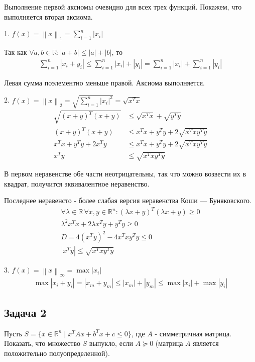 \documentclass{article}
\newcommand{\R}{\mathbb{R}}
\newcommand{\norm}[1]{\left\lVert#1\right\rVert}
\begin{document}
    Выполнение первой аксиомы очевидно для всех трех функций. Покажем, что выполняется вторая аксиома.
    \bigbreak
    
    1. $f(x) = \norm{x}_1 = \sum_{i = 1}^{n} |x_i|$
    
    Так как $\forall a, b \in \R : |a + b| \le |a| + |b|$, то
    \begin{align*}
         \sum_{i = 1}^{n} |x_i + y_i| \le 
         \sum_{i = 1}^{n} |x_i| + |y_i|  = 
         \sum_{i = 1}^{n} |x_i| + \sum_{i = 1}^{n} |y_i|
    \end{align*}
    
    Левая сумма поэлементно меньше правой. Аксиома выполняется.
    \bigbreak
    
    2. $f(x) = \norm{x}_2 = \sqrt{ \sum_{i = 1}^{n} |x_i|^2} = \sqrt{x^Tx}$
    \begin{align*}
         \sqrt{(x + y)^T(x + y)} &\le \sqrt{x^Tx} + \sqrt{y^Ty} \\
         (x + y)^T(x + y) &\le x^Tx + y^Ty + 2\sqrt{x^Txy^Ty} \\
         x^Tx + y^Ty + 2x^Ty &\le x^Tx + y^Ty + 2\sqrt{x^Txy^Ty} \\
         x^Ty &\le \sqrt{x^Txy^Ty} 
    \end{align*}
    
    В первом неравенстве обе части неотрицательны, так что можно возвести их в квадрат, получится эквивалентное неравенство.
    
    Последнее неравенсто - более слабая версия неравенства Коши — Буняковского.
    \begin{align*}
         \forall \lambda \in \R \, \forall x, y \in \R^n : (\lambda x + y)^T(\lambda x + y) \ge 0 \\
         \lambda^2 x^Tx + 2\lambda x^Ty + y^Ty \ge 0 \\
         D = 4(x^Ty)^2 - 4x^Txy^Ty \le 0 \\
         |x^Ty| \le \sqrt{x^Txy^Ty}
    \end{align*}
    \bigbreak
    
    3. $f(x) = \norm{x}_\infty = \max |x_i|$
    \begin{align*}
         \max |x_i + y_i| = |x_m + y_m| \le |x_m| + |y_m| \le \max |x_i| + \max |y_i|
    \end{align*}
    \bigbreak
    
    \subsection*{Задача 2}
    Пусть $S = \{x \in \R^n \mid  x^TAx + b^Tx + c \le 0\}$, где $A$ - симметричная матрица. Показать, что множество $S$ выпукло, если $A \succeq 0$ (матрица $A$ является положительно полуопределенной). 
    \bigbreak
    
\end{document}

